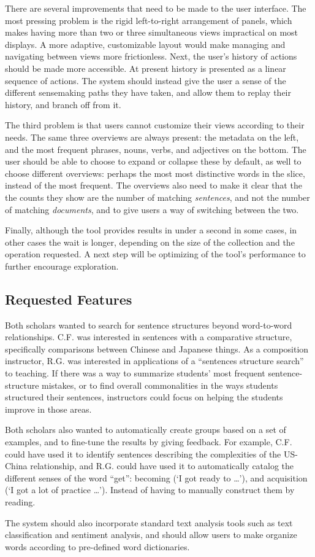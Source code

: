 \documentclass{sig-alternate}
\begin{document}
There are several improvements that need to be made to the user interface. The most pressing problem is the rigid left-to-right arrangement of panels, which makes having more than two or three simultaneous views impractical on most displays. A more adaptive, customizable layout would make managing and navigating between views more frictionless. Next, the user's history of actions should be made more accessible. At present history is presented as a linear sequence of actions. The system should instead give the user a sense of the different sensemaking paths they have taken, and allow them to replay their history, and branch off from it.

The third problem is that users cannot customize their views according to their needs. The same three overviews are always present: the metadata on the left, and the most frequent phrases, nouns, verbs, and adjectives on the bottom. The user should be able to choose to expand or collapse these by default, as well to choose different overviews: perhaps the most most distinctive words in the slice, instead of the most frequent. The overviews also need to make it clear that the the counts they show are the number of matching \emph{sentences}, and not the number of matching \emph{documents}, and to give users a way of switching between the two.

Finally, although the tool provides results in under a second in some cases, in other cases the wait is longer, depending on the size of the collection and the operation requested.  A next step will be optimizing of the tool's performance to further encourage exploration. 
 
 \subsection{Requested Features}
 Both scholars wanted to search for sentence structures beyond word-to-word relationships. C.F. was interested in sentences with a comparative structure, specifically comparisons between  Chinese and Japanese things. As a composition instructor, R.G. was interested in applications of a ``sentences structure search'' to teaching.  If there was a way to summarize students' most frequent sentence-structure mistakes, or to find overall commonalities in the ways students structured their sentences, instructors could focus on helping the students improve in those areas.
 
Both scholars also wanted to automatically create groups based on a set of examples, and to fine-tune the results by giving feedback. For example, C.F. could have used it to identify sentences describing the complexities of the US-China relationship, and R.G. could have used it to automatically catalog the different senses of the word ``get'':  becoming (`I got ready to \ldots'), and acquisition (`I got a lot of practice \ldots'). Instead of having to manually construct them by reading.
 
The system should also incorporate standard text analysis tools such as text classification and sentiment analysis, and should allow users to make organize words according to pre-defined word dictionaries.


 
  
\end{document}
